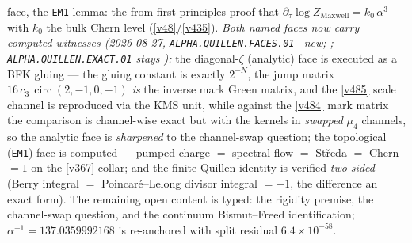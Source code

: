 \documentclass[11pt,a4paper]{article}
\newcommand{\cthree}{c_3}
\begin{document}
face, the \texttt{EM1} lemma: the from-first-principles proof that
$\partial_\tau\log Z_{\mathrm{Maxwell}}=k_0\,\alpha^3$ with $k_0$ the bulk Chern level
(\vref{v48}/\vref{v435}).
\emph{Both named faces now carry computed witnesses (2026-08-27,
\texttt{ALPHA.QUILLEN.FACES.01} \mE\ new; ;
\texttt{ALPHA.QUILLEN.EXACT.01} stays \mO):} the diagonal-$\zeta$ (analytic) face is executed
as a BFK gluing --- the gluing constant is exactly $2^{-N}$, the jump matrix
$16\,\cthree\,\operatorname{circ}(2,-1,0,-1)$ \emph{is} the inverse mark Green matrix, and the
\vref{v485} scale channel is reproduced via the KMS unit, while against the \vref{v484} mark
matrix the comparison is channel-wise exact but with the kernels in \emph{swapped} $\mu_4$
channels, so the analytic face is \emph{sharpened} to the channel-swap question; the
topological (\texttt{EM1}) face is computed --- pumped charge $=$ spectral flow $=$
St\v{r}eda $=$ Chern $=1$ on the \vref{v367} collar; and the finite Quillen identity is
verified \emph{two-sided} (Berry integral $=$ Poincar\'e--Lelong divisor integral $=+1$, the
difference an exact form). The remaining open content is typed: the rigidity premise, the
channel-swap question, and the continuum Bismut--Freed identification;
$\alpha^{-1}=137.0359992168$ is re-anchored with split residual $6.4\times10^{-58}$.
\end{document}
